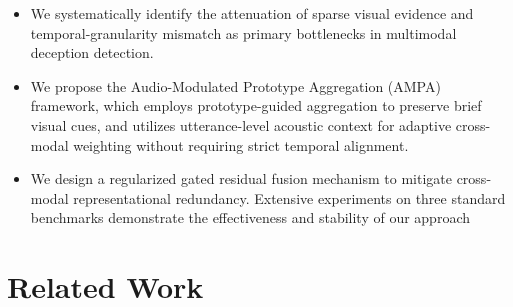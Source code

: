 \documentclass[sigconf,screen,review,anonymous]{acmart}
\begin{document}
\begin{itemize}
\item We systematically identify the attenuation of sparse visual evidence and temporal-granularity mismatch as primary bottlenecks in multimodal deception detection.
\item We propose the Audio-Modulated Prototype Aggregation (AMPA) framework, which employs prototype-guided aggregation to preserve brief visual cues, and utilizes utterance-level acoustic context for adaptive cross-modal weighting without requiring strict  temporal alignment.
\item We design a regularized gated residual fusion mechanism to mitigate cross-modal representational redundancy. Extensive experiments on three standard benchmarks demonstrate the effectiveness and stability of our approach
\end{itemize}

\section{Related Work}
\end{document}

